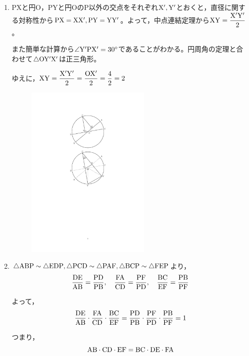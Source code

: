 \documentclass[a4paper,12pt,uplatex]{jsarticle}  %
\begin{document}
\begin{enumerate}
\item PXと円O，PYと円OのP以外の交点をそれぞれ${\rm X', Y'}$とおくと，直径に関する対称性から${\rm PX}={\rm XX'}, {\rm PY}={\rm YY'}$。よって，中点連結定理から${\rm XY} = \dfrac{{\rm X'Y'}}{2}$。

また簡単な計算から$\angle{\rm Y'PX'}=30^{\circ}$であることがわかる。円周角の定理と合わせて$\triangle {\rm OY'X'}$は正三角形。

ゆえに，${\rm XY} = \dfrac{{\rm X'Y'}}{2} = \dfrac{{\rm OX'}}{2} = \dfrac{4}{2}=2$

\begin{figure}[h]
  \centering
  \includegraphics[width=6.0cm]{jizen_2_1_solution.pdf}
\end{figure}

\bigskip

\item $\triangle{\rm ABP}\sim\triangle{\rm EDP}, \triangle{\rm PCD}\sim\triangle{\rm PAF}, \triangle{\rm BCP}\sim\triangle{\rm FEP}$より，
$$\frac{{\rm DE}}{{\rm AB}} = \frac{{\rm PD}}{{\rm PB}}, \ \ \ \frac{{\rm FA}}{{\rm CD}} = \frac{{\rm PF}}{{\rm PD}}, \ \ \ \frac{{\rm BC}}{{\rm EF}} = \frac{{\rm PB}}{{\rm PF}}$$

よって，
$$\frac{{\rm DE}}{{\rm AB}} \cdot \frac{{\rm FA}}{{\rm CD}} \cdot \frac{{\rm BC}}{{\rm EF}} = \frac{{\rm PD}}{{\rm PB}} \cdot \frac{{\rm PF}}{{\rm PD}} \cdot \frac{{\rm PB}}{{\rm PF}} = 1$$

つまり，
$$\rm AB \cdot CD \cdot EF = \rm BC \cdot DE \cdot FA$$


\end{enumerate}
\end{document}
